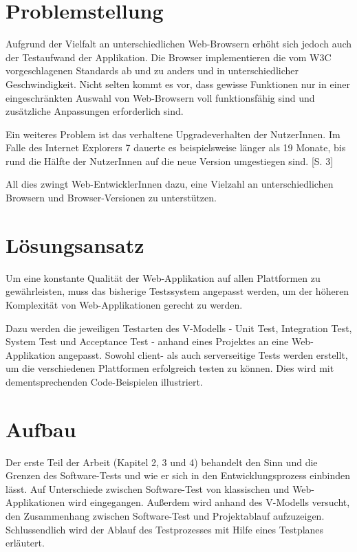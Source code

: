 \documentclass[a4paper,bibtotoc,oneside]{scrbook}
\begin{document}
\section{Problemstellung}
Aufgrund der Vielfalt an unterschiedlichen Web-Browsern erhöht sich jedoch auch der Testaufwand der Applikation. Die Browser implementieren die vom W3C vorgeschlagenen Standards ab und zu anders und in unterschiedlicher Geschwindigkeit. Nicht selten kommt es vor, dass gewisse Funktionen nur in einer eingeschränkten Auswahl von Web-Browsern voll funktionsfähig sind und zusätzliche Anpassungen erforderlich sind. \cite{caniuse}

Ein weiteres Problem ist das verhaltene Upgradeverhalten der NutzerInnen. Im Falle des Internet Explorers 7 dauerte es beispielsweise länger als 19 Monate, bis rund die Hälfte der NutzerInnen auf die neue Version umgestiegen sind. \cite{insecure}[S. 3]

All dies zwingt Web-EntwicklerInnen dazu, eine Vielzahl an unterschiedlichen Browsern und Browser-Versionen zu unterstützen.


\section{Lösungsansatz}
Um eine konstante Qualität der Web-Applikation auf allen Plattformen zu gewährleisten, muss das bisherige Testssystem angepasst werden, um der höheren Komplexität von Web-Applikationen gerecht zu werden. 

Dazu werden die jeweiligen Testarten des V-Modells - Unit Test, Integration Test, System Test und Acceptance Test - anhand eines Projektes an eine Web-Applikation angepasst. Sowohl client- als auch serverseitige Tests werden erstellt, um die verschiedenen Plattformen erfolgreich testen zu können. Dies wird mit dementsprechenden Code-Beispielen illustriert.

\newpage

\section{Aufbau}
Der erste Teil der Arbeit (Kapitel 2, 3 und 4) behandelt den Sinn und die Grenzen des Software-Tests und wie er sich in den Entwicklungsprozess einbinden lässt. Auf Unterschiede zwischen Software-Test von klassischen und Web-Applikationen wird eingegangen. Außerdem wird anhand des V-Modells versucht, den Zusammenhang zwischen Software-Test und Projektablauf aufzuzeigen. Schlussendlich wird der Ablauf des Testprozesses mit Hilfe eines Testplanes erläutert.
\end{document}
